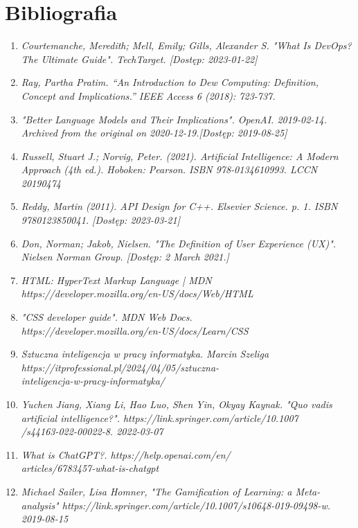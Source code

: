 \section{Bibliografia}

\begin{enumerate}

\item {\textit {Courtemanche, Meredith; Mell, Emily; Gills, Alexander S. "What Is DevOps? The Ultimate Guide". TechTarget. [Dostęp: 2023-01-22]}}
\item {\textit {Ray, Partha Pratim. “An Introduction to Dew Computing: Definition, Concept and Implications.” IEEE Access 6 (2018): 723-737.}}

\item {\textit {"Better Language Models and Their Implications". OpenAI. 2019-02-14. Archived from the original on 2020-12-19.[Dostęp: 2019-08-25]}}
\item {\textit {Russell, Stuart J.; Norvig, Peter. (2021). Artificial Intelligence: A Modern Approach (4th ed.). Hoboken: Pearson. ISBN 978-0134610993. LCCN 20190474}}
\item {\textit {Reddy, Martin (2011). API Design for C++. Elsevier Science. p. 1. ISBN 9780123850041. [Dostęp: 2023-03-21]}}
\item {\textit {Don, Norman; Jakob, Nielsen. "The Definition of User Experience (UX)". Nielsen Norman Group. [Dostęp: 2 March 2021.]}}
\item {\textit {HTML: HyperText Markup Language | MDN \\ https://developer.mozilla.org/en-US/docs/Web/HTML}}
\item {\textit {"CSS developer guide". MDN Web Docs. \\ https://developer.mozilla.org/en-US/docs/Learn/CSS}}
\item {\textit {Sztuczna inteligencja w pracy informatyka. Marcin Szeliga \\ https://itprofessional.pl/2024/04/05/sztuczna-\\inteligencja-w-pracy-informatyka/}}
\item {\textit {Yuchen Jiang, Xiang Li, Hao Luo, Shen Yin, Okyay Kaynak. "Quo vadis artificial intelligence?". https://link.springer.com/article/10.1007\\/s44163-022-00022-8. 2022-03-07}}
\item {\textit {What is ChatGPT?. https://help.openai.com/en/\\articles/6783457-what-is-chatgpt}}
\item {\textit {Michael Sailer, Lisa Homner, "The Gamification of Learning: a Meta-analysis" https://link.springer.com/article/10.1007/s10648-019-09498-w. 2019-08-15}}

\end{enumerate}
